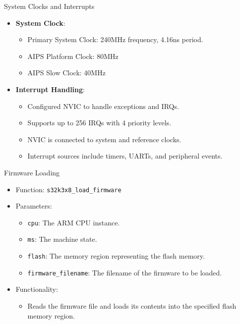 \begin{frame}{System Clocks and Interrupts}
    \begin{itemize}
        \item \textbf{System Clock}:
        \begin{itemize}
            \item Primary System Clock: 240MHz frequency, 4.16ns period.
            \item AIPS Platform Clock: 80MHz
            \item AIPS Slow Clock: 40MHz
        \end{itemize}
        \item \textbf{Interrupt Handling}:
        \begin{itemize}
            \item Configured NVIC to handle exceptions and IRQs.
            \item Supports up to 256 IRQs with 4 priority levels.
            \item NVIC is connected to system and reference clocks.
            \item Interrupt sources include timers, UARTs, and peripheral events.
        \end{itemize}
    \end{itemize}
\end{frame}

\begin{frame}{Firmware Loading}
    \begin{itemize}
        \item Function: \texttt{s32k3x8\_load\_firmware}
        \item Parameters:
        \begin{itemize}
            \item \texttt{cpu}: The ARM CPU instance.
            \item \texttt{ms}: The machine state.
            \item \texttt{flash}: The memory region representing the flash memory.
            \item \texttt{firmware\_filename}: The filename of the firmware to be loaded.
        \end{itemize}
        \item Functionality:
        \begin{itemize}
            \item Reads the firmware file and loads its contents into the specified flash memory region.
        \end{itemize}
    \end{itemize}
\end{frame}

